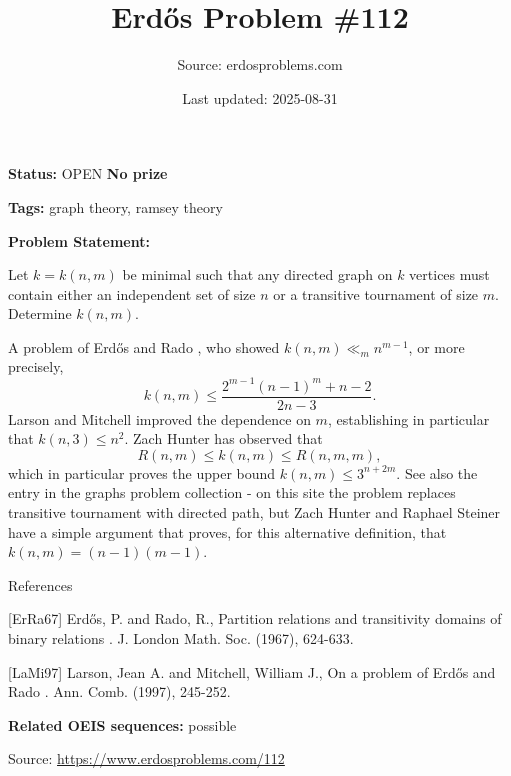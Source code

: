 \documentclass{article}
\title{Erd\H{o}s Problem \#112}
\date{Last updated: 2025-08-31}
\author{Source: erdosproblems.com}
\begin{document}
\maketitle

\noindent\textbf{Status:} OPEN \quad \textbf{No prize}

\noindent\textbf{Tags:} graph theory, ramsey theory

\medskip

\noindent\textbf{Problem Statement:}

Let $k=k(n,m)$ be minimal such that any directed graph on $k$ vertices must contain either an independent set of size $n$ or a transitive tournament of size $m$. Determine $k(n,m)$.




A problem of Erd\H{o}s and Rado \cite{ErRa67}, who showed $k(n,m) \ll_m n^{m-1}$, or more precisely,\[k(n,m) \leq \frac{2^{m-1}(n-1)^m+n-2}{2n-3}.\]Larson and Mitchell \cite{LaMi97} improved the dependence on $m$, establishing in particular that $k(n,3)\leq n^{2}$. Zach Hunter has observed that\[R(n,m) \leq k(n,m)\leq R(n,m,m),\]which in particular proves the upper bound $k(n,m)\leq 3^{n+2m}$. See also the entry in the graphs problem collection - on this site the problem replaces transitive tournament with directed path, but Zach Hunter and Raphael Steiner have a simple argument that proves, for this alternative definition, that $k(n,m)=(n-1)(m-1)$.




References

[ErRa67] Erd\H{o}s, P. and Rado, R., Partition relations and transitivity domains of binary relations . J. London Math. Soc. (1967), 624-633.

[LaMi97] Larson, Jean A. and Mitchell, William J., On a problem of Erd\H{o}s and Rado . Ann. Comb. (1997), 245-252.

\noindent\textbf{Related OEIS sequences:} possible


\bigskip
\noindent\small{Source: \url{https://www.erdosproblems.com/112}}
\end{document}

